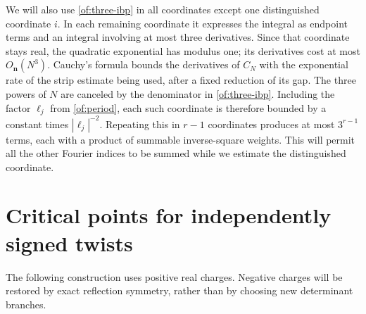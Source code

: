 \documentclass[11pt]{article}
\numberwithin{equation}{section}
\theoremstyle{definition}\newtheorem{definition}[theorem]{Definition}
\theoremstyle{remark}\newtheorem{remark}[theorem]{Remark}
\begin{document}
We will also use \eqref{of:three-ibp} in all coordinates except
one distinguished coordinate $i$. In each remaining coordinate it
expresses the integral as endpoint terms and an integral involving
at most three derivatives. Since that coordinate stays real, the
quadratic exponential has modulus one; its derivatives cost at most
$O_{\boldsymbol n}(N^3)$. Cauchy's formula bounds the derivatives
of $C_N$ with the exponential rate of the strip estimate being used,
after a fixed reduction of its gap. The three powers of $N$ are
canceled by the denominator in \eqref{of:three-ibp}. Including the
factor $\ell_j$ from \eqref{of:period}, each such coordinate is
therefore bounded by a constant times $|\ell_j|^{-2}$.
Repeating this in $r-1$ coordinates produces at most $3^{r-1}$
terms, each with a product of summable inverse-square weights. This
will permit all the other Fourier indices to be summed while we
estimate the distinguished coordinate.

\section{Critical points for independently signed twists}

The following construction uses positive real charges. Negative charges
will be restored by exact reflection symmetry, rather than by choosing
new determinant branches.
\end{document}
